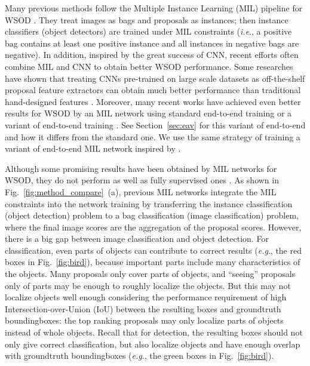 \documentclass[10pt,journal,compsoc]{IEEEtran}
\def\eg{\emph{e.g}.} \def\Eg{\emph{E.g}.}
\def\ie{\emph{i.e}.} \def\Ie{\emph{I.e}.}
\begin{document}
Many previous methods follow the Multiple Instance Learning (MIL) pipeline for WSOD \cite{Ref:Ren2016,Ref:Cinbis2017,Ref:Wang2015,Ref:Shi2017,Ref:Tang2017deep,Ref:Bilen2016,Ref:Kantorov2016,Ref:Diba2017}.
They treat images as bags and proposals as instances;
then instance classifiers (object detectors) are trained under MIL constraints
(\ie, a positive bag contains at least one positive instance and all instances in negative bags are negative).
In addition, inspired by the great success of CNN,
recent efforts often combine MIL and CNN to obtain better WSOD performance.
Some researches have shown that treating CNNs pre-trained on large scale datasets as off-the-shelf proposal feature extractors can obtain much better performance than traditional hand-designed features \cite{Ref:Ren2016,Ref:Cinbis2017,Ref:Wang2015,Ref:Shi2017}.
{Moreover, many recent works have achieved even better results for WSOD by an MIL network using standard end-to-end training \cite{Ref:Tang2017deep,Ref:Kantorov2016} or a variant of end-to-end training \cite{Ref:Bilen2016,Ref:Diba2017}.
See Section~\ref{sec:eav} for this variant of end-to-end and how it differs from the standard one.
We use the same strategy of training a variant of end-to-end MIL network inspired by \cite{Ref:Bilen2016,Ref:Diba2017}.}

Although some promising results have been obtained by MIL networks for WSOD,
they do not perform as well as fully supervised ones \cite{Ref:Girshick2016,Ref:Girshick2015,Ref:Ren2017}.
As shown in Fig.~\ref{fig:method_compare}~(a),
previous MIL networks integrate the MIL constraints into the network training by transferring the instance classification (object detection) problem to a bag classification (image classification) problem,
where the final image scores are the aggregation of the proposal scores.
However, there is a big gap between image classification and object detection.
For classification, even parts of objects can contribute to correct results (\eg, the red boxes in Fig.~\ref{fig:bird}),
because important parts include many characteristics of the objects.
Many proposals only cover parts of objects,
and ``seeing'' proposals only of parts may be enough to roughly localize the objects.
But this may not localize objects well enough considering the performance requirement of high Intersection-over-Union (IoU) between the resulting boxes and groundtruth boundingboxes:
the top ranking proposals may only localize parts of objects instead of whole objects.
Recall that for detection, the resulting boxes should not only give correct classification,
but also localize objects and have enough overlap with groundtruth boundingboxes (\eg, the green boxes in Fig.~\ref{fig:bird}).
\end{document}
